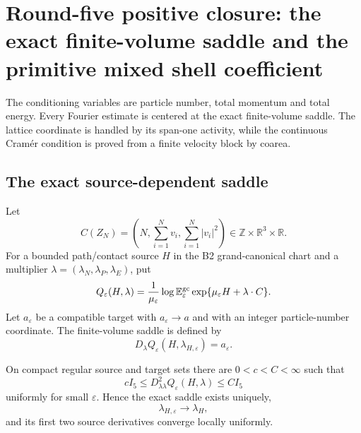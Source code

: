 \section{Round-five positive closure: the exact finite-volume saddle and the primitive mixed shell coefficient}
\label{sec:r5-b1}

The conditioning variables are particle number, total momentum and total
energy.  Every Fourier estimate is centered at the exact finite-volume saddle.
The lattice coordinate is handled by its span-one activity, while the
continuous Cram\'er condition is proved from a finite velocity block by
coarea.

\subsection{The exact source-dependent saddle}

Let
\[
 C(Z_N)=\left(N,\sum_{i=1}^Nv_i,
                   \sum_{i=1}^N|v_i|^2\right)
 \in\mathbb Z\times\mathbb R^3\times\mathbb R.
\]
For a bounded path/contact source \(H\) in the B2 grand-canonical chart and a
multiplier \(\lambda=(\lambda_N,\lambda_P,\lambda_E)\), put
\[
 Q_\varepsilon(H,\lambda)=
 \frac1{\mu_\varepsilon}
 \log\mathbb E_\varepsilon^{\rm gc}
 \exp\{\mu_\varepsilon H+\lambda\cdot C\}.
\]
Let \(a_\varepsilon\) be a compatible target with
\(a_\varepsilon\to a\) and with an integer particle-number coordinate.  The
finite-volume saddle is defined by
\[
 D_\lambda Q_\varepsilon(H,\lambda_{H,\varepsilon})
 =a_\varepsilon.
\]

\begin{lemma}
\label{lem:r5-b1-convex}
On compact regular source and target sets there are \(0<c<C<\infty\) such
that
\[
 cI_5\le D_{\lambda\lambda}^2Q_\varepsilon(H,\lambda)
 \le CI_5
\]
uniformly for small \(\varepsilon\).  Hence the exact saddle exists uniquely,
\[
 \lambda_{H,\varepsilon}\to\lambda_H,
\]
and its first two source derivatives converge locally uniformly.
\end{lemma}

